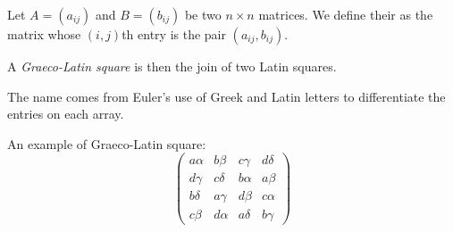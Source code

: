 \documentclass[12pt]{article}
\begin{document}
Let $A=(a_{ij})$ and $B=(b_{ij})$ be two $n\times n$ matrices. We define their \emph{} as the matrix whose $(i,j)$th entry is the pair $(a_{ij},b_{ij})$.

A \emph{Graeco-Latin square} is then the join of two Latin squares.

The name comes from Euler's use of Greek and Latin letters to differentiate the entries on each array.

An example of Graeco-Latin square:
\begin{equation*}
\begin{pmatrix}
a\alpha & b\beta & c\gamma & d\delta\\
d\gamma & c\delta & b\alpha & a\beta\\
b\delta & a\gamma & d\beta &  c\alpha\\
c\beta & d\alpha & a\delta & b\gamma
\end{pmatrix}
\end{equation*}
\end{document}
